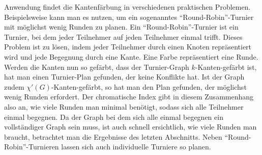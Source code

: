 \documentclass[a4paper,12pt,ngerman,chapterprefix=false,listof=totoc,bibliography=totoc]{scrreprt}
\begin{document}
{Anwendung findet die Kantenfärbung in verschiedenen praktischen Problemen. Beispielsweise kann man es nutzen, um ein sogenanntes "`Round-Robin"'-Turnier mit möglichst wenig Runden zu planen. Ein "`Round-Robin"'-Turnier ist ein Turnier, bei dem jeder Teilnehmer auf jeden Teilnehmer einmal trifft. Dieses Problem ist zu lösen, indem jeder Teilnehmer durch einen Knoten repräsentiert wird und jede Begegnung durch eine Kante. Eine Farbe repräsentiert eine Runde. Werden die Kanten nun so gefärbt, dass der Turnier-Graph \(k\)-Kanten-gefärbt ist, hat man einen Turnier-Plan gefunden, der keine Konflikte hat. Ist der Graph zudem \(\chi '(G)\)-Kanten-gefärbt, so hat man den Plan gefunden, der möglichst wenig Runden erfordert. Der chromatische Index gibt in diesem Zusammenhang also an, wie viele Runden man minimal benötigt, sodass sich alle Teilnehmer einmal begegnen. Da der Graph bei dem sich alle einmal begegnen ein vollständiger Graph sein muss, ist auch schnell ersichtlich, wie viele Runden man braucht, betrachtet man die Ergebnisse des letzten Abschnitts. Neben "`Round-Robin"'-Turnieren lassen sich auch individuelle Turniere so planen. \cite{gross_handbook_2004}
}
\end{document}
